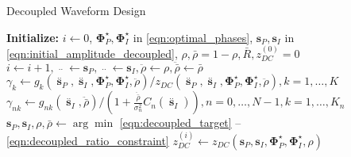 \begin{algorithm}
  \caption{Decoupled Waveform Design}
  \label{alg:decoupled}
  \begin{algorithmic}[1]
    \State \textbf{Initialize:} $i \leftarrow 0$, ${\mathbf{\Phi }}_P^ \star ,{\mathbf{\Phi }}_I^ \star $ in \ref{eqn:optimal_phases}, ${{{\mathbf{s}}_P},{{\mathbf{s}}_I}}$ in \ref{eqn:initial_amplitude_decoupled}, $\rho ,\bar \rho  = 1 - \rho ,\bar R,z_{DC}^{(0)} = 0$
    \Repeat
      \State $i \leftarrow i + 1,\mathop {{{\mathbf{s}}_P}}\limits^{..}  \leftarrow {{\mathbf{s}}_P},\mathop {{{\mathbf{s}}_P}}\limits^{..}  \leftarrow {{\mathbf{s}}_I},\ddot \rho  \leftarrow \rho ,\ddot \bar \rho  \leftarrow \bar \rho $
      \State ${\gamma _k} \leftarrow {g_k}\left( {{{\mathop {\mathbf{s}}\limits^{..} }_P},{{\mathop {\mathbf{s}}\limits^{..} }_I},{\mathbf{\Phi }}_P^ \star ,{\mathbf{\Phi }}_I^ \star ,\ddot \rho } \right)/{z_{DC}}\left( {{{\mathop {\mathbf{s}}\limits^{..} }_P},{{\mathop {\mathbf{s}}\limits^{..} }_I},{\mathbf{\Phi }}_P^ \star ,{\mathbf{\Phi }}_I^ \star ,\ddot \rho } \right),k = 1, \ldots ,K$
      \State ${\gamma _{nk}} \leftarrow {g_{nk}}\left( {{{\mathop {\mathbf{s}}\limits^{..} }_I},\ddot \bar \rho } \right)/\left( {1 + \frac{{\ddot \bar \rho }}{{\sigma _n^2}}{C_n}\left( {{{\mathop {\mathbf{s}}\limits^{..} }_I}} \right)} \right),n = 0, \ldots ,N - 1,k = 1, \ldots ,{K_n}$
      \State ${{\mathbf{s}}_P},{{\mathbf{s}}_I},\rho ,\bar \rho  \leftarrow \arg \min $ \ref{eqn:decoupled_target} -- \ref{eqn:decoupled_ratio_constraint}
      \State $z_{DC}^{(i)} \leftarrow {z_{DC}}\left( {{{\mathbf{s}}_P},{{\mathbf{s}}_I},{\mathbf{\Phi }}_P^ \star ,{\mathbf{\Phi }}_I^ \star ,\rho } \right)$
  \end{algorithmic}
\end{algorithm} 